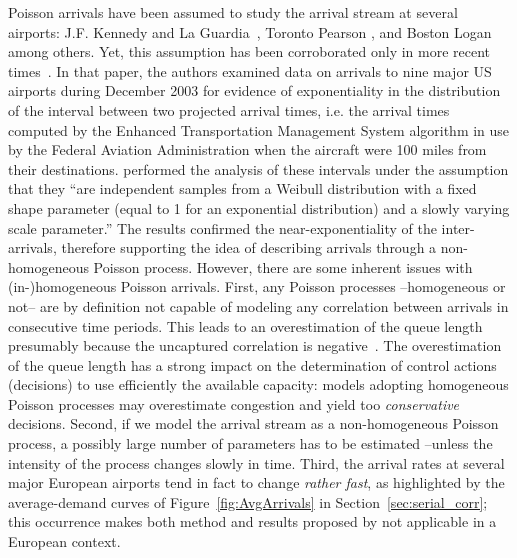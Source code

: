 \documentclass[draft,review]{elsarticle}
\makeatletter
\newcommand*{\ie}{i.e.\@\xspace}
\makeatother
\begin{document}
Poisson arrivals have been assumed to study the arrival stream at several airports:  J.F. Kennedy and La Guardia~\citep{Koop1972}, Toronto Pearson \citep{Bookbinder1986}, and Boston Logan~\citep{HO1975} among others. Yet, this assumption has been corroborated only in more recent times~\citep{willemain2004statistical}.
In that paper, the authors examined data on arrivals to nine major US airports during December 2003 for evidence of exponentiality in the distribution of the interval between two projected arrival times, \ie{} the arrival times computed by the Enhanced Transportation Management System algorithm in use by the Federal Aviation Administration when the aircraft were 100 miles from their destinations. \citet{willemain2004statistical} performed the analysis of these intervals under the assumption that they ``are independent samples from a Weibull distribution with a fixed shape parameter (equal to 1 for an exponential distribution) and a slowly varying scale parameter.''
The results confirmed the near-exponentiality of the inter-arrivals, therefore supporting the idea of describing arrivals through a non-homogeneous Poisson process.
However, there are some inherent issues with (in-)homogeneous Poisson arrivals.
First, any Poisson processes --homogeneous or not-- are by definition not capable of modeling any correlation between arrivals in consecutive time periods.
This leads to an overestimation of the queue length presumably because the uncaptured correlation is negative~\citep{caccavale2014model}.
The overestimation of the queue length has a strong impact on the determination of control actions (decisions) to use efficiently the available capacity: models adopting homogeneous Poisson processes may overestimate congestion and yield too \emph{conservative} decisions.
Second, if we model the arrival stream as a non-homogeneous Poisson process, a possibly large number of parameters has to be estimated --unless the intensity of the process changes slowly in time. %
Third, the arrival rates at several major European airports tend in fact to change \emph{rather fast}, as highlighted by the average-demand curves of Figure~\ref{fig:AvgArrivals} in Section~\ref{sec:serial_corr}; this occurrence makes both method and results proposed by \citet{willemain2004statistical} not applicable in a European context.
\end{document}
